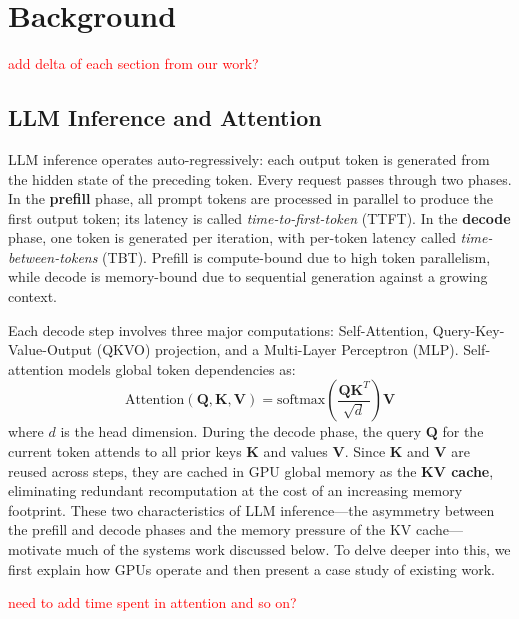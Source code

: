 \section{Background}
\label{sec:background}

\textcolor{red}{add delta of each section from our work?}

\subsection{LLM Inference and Attention}
LLM inference operates auto-regressively: each output token is generated from the hidden state of the preceding token. Every request passes through two phases. In the \textbf{prefill} phase, all prompt tokens are processed in parallel to produce the first output token; its latency is called \textit{time-to-first-token} (TTFT). In the \textbf{decode} phase, one token is generated per iteration, with per-token latency called \textit{time-between-tokens} (TBT). Prefill is compute-bound due to high token parallelism, while decode is memory-bound due to sequential generation against a growing context.

Each decode step involves three major computations: Self-Attention, Query-Key-Value-Output (QKVO) projection, and a Multi-Layer Perceptron (MLP). Self-attention models global token dependencies as:
\begin{equation}
    \text{Attention}(\mathbf{Q}, \mathbf{K}, \mathbf{V}) = \text{softmax}\left(\frac{\mathbf{Q}\mathbf{K}^T}{\sqrt{d}}\right)\mathbf{V}
\end{equation}
where $d$ is the head dimension. During the decode phase, the query $\mathbf{Q}$ for the current token attends to all prior keys $\mathbf{K}$ and values $\mathbf{V}$. Since $\mathbf{K}$ and $\mathbf{V}$ are reused across steps, they are cached in GPU global memory as the \textbf{KV cache}, eliminating redundant recomputation at the cost of an increasing memory footprint. These two characteristics of LLM inference—the asymmetry between the prefill and decode phases and the memory pressure of the KV cache—motivate much of the systems work discussed below. To delve deeper into this, we first explain how GPUs operate and then present a case study of existing work.

\textcolor{red}{need to add time spent in attention and so on?}


